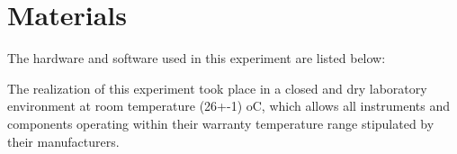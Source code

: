\section{Materials}

The hardware and software used in this experiment are listed below:

The realization of this experiment took place in a closed and dry laboratory environment at room temperature (26+-1)  oC, which allows all instruments and components operating within their warranty temperature range stipulated by their manufacturers.

